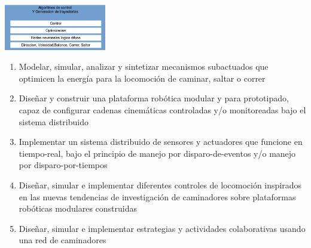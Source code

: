 {\begin{frame}[plain,t,label=exp_capas]
{{        \begin{center}
          \includegraphics[height=2.0cm]{../images/objCapaControl.png}
        \end{center}
      }
      \vspace{-0.2cm}\hspace{-1.0cm}
      \parbox[c]{12cm}{
        \begin{enumerate}[\textbf{OE:} 1.]\scriptsize
        \item Modelar, simular, analizar y sintetizar mecanismos subactuados que optimicen la energ\'ia para la locomoci\'on de caminar, saltar o correr
        \item Dise\~nar y construir una plataforma rob\'otica modular y para prototipado, capaz de configurar cadenas cinem\'aticas  controladas y/o monitoreadas bajo el sistema distribuido
        \item Implementar un sistema distribuido de sensores y actuadores que funcione en tiempo-real, bajo el principio de manejo por disparo-de-eventos y/o manejo por disparo-por-tiempos
        \item Dise\~nar, simular e implementar diferentes controles de locomoci\'on inspirados en las nuevas tendencias de investigaci\'on de caminadores sobre plataformas rob\'oticas modulares construidas
        \item Dise\~nar, simular e implementar estrategias y actividades colaborativas usando una red de caminadores
        \end{enumerate}
      }
    }
    \hyperlink{def_objesp}{}
  \end{frame}
}